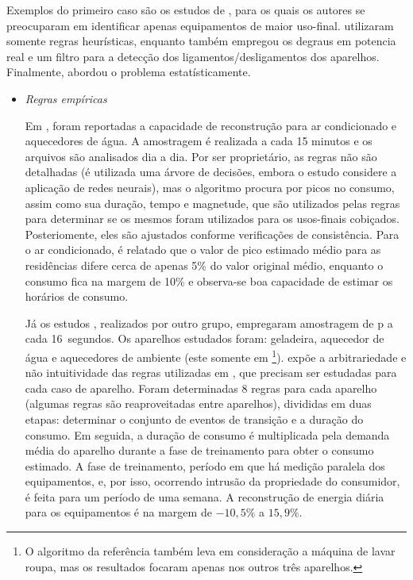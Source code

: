 \begin{enumerate}[label=\textbf{1.\arabic*},wide=\parindent]
\begin{enumerate}[label*=.\textbf{\arabic*},wide=\parindent]
Exemplos do primeiro caso são os estudos de
\citet*{nilm_powers_15minsamp_1991_16,nilm_farinaccio_16ssamp_1999_17,
nilm_marceau_16ssamp_improved_1999_18,
nilm_zeifman_statistical_approach_resumo_2013},
para os quais os autores se preocuparam em identificar apenas
equipamentos de maior uso-final.
\cite{nilm_powers_15minsamp_1991_16,nilm_farinaccio_16ssamp_1999_17}
utilizaram somente regras heurísticas, enquanto
\cite{nilm_marceau_16ssamp_improved_1999_18} também empregou os
degraus em potencia real e um filtro para a detecção dos
ligamentos/desligamentos dos aparelhos. Finalmente,
\cite{nilm_zeifman_statistical_approach_resumo_2013} abordou o problema
estatísticamente.

\begin{itemize}[wide=\parindent]
\item \emph{Regras empíricas}

Em \cite{nilm_powers_15minsamp_1991_16}, foram reportadas a capacidade
de reconstrução para ar condicionado e aquecedores de água. A
amostragem é realizada a cada 15 minutos e os arquivos são analisados
dia a dia. Por ser proprietário, as regras não são detalhadas (é
utilizada uma árvore de decisões, embora o estudo considere a aplicação
de redes neurais), mas o algoritmo procura por picos no consumo, assim
como sua duração, tempo e magnetude, que são utilizados pelas regras
para determinar se os mesmos foram utilizados para os usos-finais
cobiçados. Posteriomente, eles são ajustados conforme
verificações de consistência. Para o ar condicionado, é relatado que o
valor de pico estimado médio para as residências difere cerca de
apenas 5\% do valor original médio, enquanto o consumo fica na margem
de 10\% e observa-se boa capacidade de estimar os horários de consumo.
 
Já os estudos \cite{nilm_farinaccio_16ssamp_1999_17,
nilm_marceau_16ssamp_improved_1999_18}, realizados por outro
grupo, empregaram amostragem de \acrshort{p} a cada 16~segundos. Os
aparelhos estudados foram: geladeira, aquecedor de água e aquecedores
de ambiente (este somente em
\cite{nilm_marceau_16ssamp_improved_1999_18}\footnote{O algoritmo da
referência \cite{nilm_marceau_16ssamp_improved_1999_18}
também leva em consideração a máquina de lavar roupa, mas os
resultados focaram apenas nos outros três aparelhos.}).
\cite{nilm_zeifman_review_2011} expõe a arbitrariedade e não
intuitividade das regras utilizadas em
\cite{nilm_farinaccio_16ssamp_1999_17}, que precisam ser estudadas
para cada caso de aparelho. Foram determinadas 8 regras para cada
aparelho (algumas regras são reaproveitadas entre aparelhos),
divididas em duas etapas: determinar o conjunto de eventos de
transição e a duração do consumo.  Em seguida, a duração de consumo é
multiplicada pela demanda média do aparelho durante a fase de
treinamento para obter o consumo estimado. A fase de treinamento,
período em que há medição paralela dos equipamentos, e, por isso,
ocorrendo intrusão da propriedade do consumidor, é feita para um
período de uma semana. A reconstrução de energia diária para os
equipamentos é na margem de $-10,5\%$ a $15,9\%$.


\end{itemize}
\end{enumerate}
\end{enumerate}
